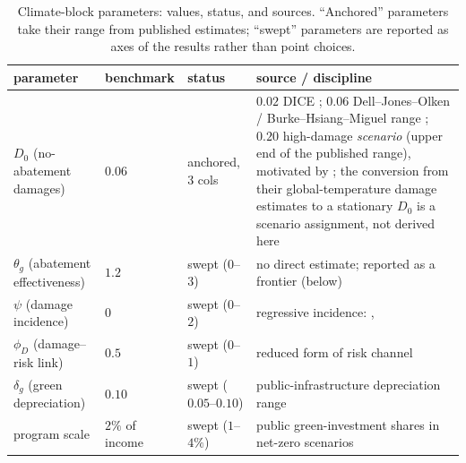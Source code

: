 \documentclass[12pt]{article}
\begin{document}
\begin{table}[!htb]
\centering\small
\caption{Climate-block parameters: values, status, and sources. ``Anchored''
parameters take their range from published estimates; ``swept'' parameters
are reported as axes of the results rather than point choices.}
\label{tab:sources}
\footnotesize
\setlength{\tabcolsep}{4pt}
\begin{tabular}{lll p{}}
\toprule
parameter & benchmark & status & source / discipline \\
\midrule
$D_0$ (no-abatement damages) & $0.06$ & anchored, 3 cols &
  $0.02$ DICE \citep{nordhaus2017}; $0.06$ Dell--Jones--Olken /
  Burke--Hsiang--Miguel range \citep{hsiang2017,carleton2022};
  $0.20$ high-damage \emph{scenario} (upper end of the published range),
  motivated by \citet{bilalkanzig2024}; the conversion from their
  global-temperature damage estimates to a stationary $D_0$ is a scenario
  assignment, not derived here \\
$\theta_g$ (abatement effectiveness) & $1.2$ & swept ($0$--$3$) &
  no direct estimate; reported as a frontier (below) \\
$\psi$ (damage incidence) & $0$ & swept ($0$--$2$) &
  regressive incidence: \citet{kanzig2023carbon}, \citet{fried2018} \\
$\phi_D$ (damage--risk link) & $0.5$ & swept ($0$--$1$) &
  reduced form of \citet{acharya2023optimal} risk channel \\
$\delta_g$ (green depreciation) & $0.10$ & swept ($0.05$--$0.10$) &
  public-infrastructure depreciation range \\
program scale & $2\%$ of income & swept ($1$--$4\%$) &
  public green-investment shares in net-zero scenarios \\
\bottomrule
\end{tabular}
\end{table}
\end{document}
